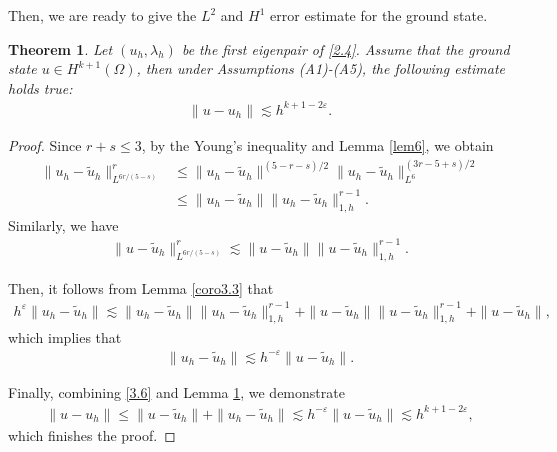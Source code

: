 \documentclass[compress, preprint,9pt]{elsarticle}
\numberwithin{equation}{section}
\newtheorem{theo}{Theorem}[section]
\newcommand{\eps}{\varepsilon}
\begin{document}
Then, we are ready to give the $L^2$ and $H^1$ error estimate for the ground state.
\begin{theo}\label{theo7}
	Let $(u_h,\lambda_h)$ be the first eigenpair of \eqref{2.4}. Assume that the ground state $u\in H^{k+1}(\Omega)$, then under Assumptions (A1)-(A5), the following estimate holds true:
	\begin{eqnarray*}
		\|u-u_h\|\lesssim h^{k+1-2\eps}.
	\end{eqnarray*}
\end{theo}
\begin{proof}
	Since $r+s\le 3$, by the Young's inequality and Lemma \ref{lem6}, we obtain
	\begin{equation}\label{3.21}
		\begin{aligned}
			\|u_h-\widetilde{u}_h\|^r_{L^{6r/(5-s)}}&\le \|u_h-\widetilde{u}_h\|^{(5-r-s)/2}\|u_h-\widetilde{u}_h\|^{(3r-5+s)/2}_{L^6}\\
			&\le \|u_h-\widetilde{u}_h\|\|u_h-\widetilde{u}_h\|_{1,h}^{r-1}.
		\end{aligned}
	\end{equation}
	Similarly, we have
	\begin{eqnarray*}
		\|u-\widetilde{u}_h\|^r_{L^{6r/(5-s)}}\lesssim \|u-\widetilde{u}_h\|\|u-\widetilde{u}_h\|_{1,h}^{r-1}.
	\end{eqnarray*}
	
	Then, it follows from Lemma \ref{coro3.3} that
	\begin{eqnarray*}
		h^\eps\|u_h-\widetilde{u}_h\|\lesssim \|u_h-\widetilde{u}_h\|\|u_h-\widetilde{u}_h\|_{1,h}^{r-1}+\|u-\widetilde{u}_h\|\|u-\widetilde{u}_h\|_{1,h}^{r-1}+\|u-\widetilde{u}_h\|,
	\end{eqnarray*}
	which implies that
	\begin{eqnarray*}
		\|u_h-\widetilde{u}_h\|\lesssim h^{-\eps}\|u-\widetilde{u}_h\|.
	\end{eqnarray*}
	
	Finally, combining \eqref{3.6} and Lemma \ref{theo7}, we demonstrate
	\begin{eqnarray*}
		\|u-u_h\|\le \|u-\widetilde{u}_h\|+\|u_h-\widetilde{u}_h\|\lesssim h^{-\eps}\|u-\widetilde{u}_h\|\lesssim h^{k+1-2\eps},
	\end{eqnarray*}
	which finishes the proof.
\end{proof}
\end{document}
